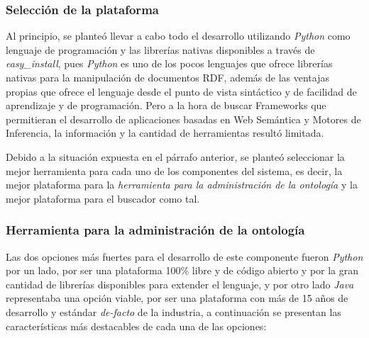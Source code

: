 \subsubsection{Selección de la plataforma}
Al principio, se planteó llevar a cabo todo el desarrollo utilizando \textit{Python} como lenguaje de programación y las librerías nativas disponibles a través de \textit{easy\_install}, pues \textit{Python} es uno de los pocos lenguajes que ofrece librerías nativas para la manipulación de documentos RDF, además de las ventajas propias que ofrece el lenguaje desde el punto de vista sintáctico y de facilidad de aprendizaje y de programación. Pero a la hora de buscar Frameworks que permitieran el desarrollo de aplicaciones basadas en Web Semántica y Motores de Inferencia, la información y la cantidad de herramientas resultó limitada.

Debido a la situación expuesta en el párrafo anterior, se planteó seleccionar la mejor herramienta para cada uno de los componentes del sistema, es decir, la mejor plataforma para la \textit{herramienta para la administración de la ontología} y la mejor plataforma para el buscador como tal.

\subsubsection{Herramienta para la administración de la ontología}
Las dos opciones más fuertes para el desarrollo de este componente fueron \textit{Python} por un lado, por ser una plataforma 100\% libre y de código abierto y por la gran cantidad de librerías disponibles para extender el lenguaje, y por otro lado \textit{Java} representaba una opción viable, por ser una plataforma con más de 15 años de desarrollo y estándar \textit{de-facto} de la industria, a continuación se presentan las características más destacables de cada una de las opciones:

